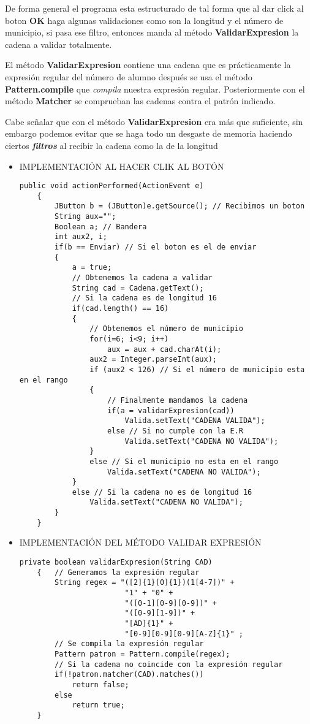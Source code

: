 \documentclass[12pt]{article}
\begin{document}
	De forma general el programa esta estructurado de tal forma que al dar click al boton \textbf{OK} haga algunas validaciones como son la longitud y el número de municipio, si pasa ese filtro, entonces manda al método \textbf{ValidarExpresion} la cadena a validar totalmente.

	El método \textbf{ValidarExpresion} contiene una cadena que es prácticamente la expresión regular del número de alumno después se usa el método \textbf{Pattern.compile}  que \textsl{compila} nuestra expresión regular. Posteriormente con el método \textbf{Matcher} se comprueban las cadenas contra el patrón indicado.

	Cabe señalar que con el método \textbf{ValidarExpresion} era más que suficiente, sin embargo podemos evitar que se haga todo un desgaste de memoria haciendo ciertos \textbf{\textsl{filtros}} al recibir la cadena como la de la longitud

	\newpage
	\begin{itemize}
		\item IMPLEMENTACIÓN AL HACER CLIK AL BOTÓN
		\begin{lstlisting}[style=Java]
	public void actionPerformed(ActionEvent e)
	{
		JButton b = (JButton)e.getSource(); // Recibimos un boton
		String aux="";
		Boolean a; // Bandera
		int aux2, i;
		if(b == Enviar) // Si el boton es el de enviar
		{	
			a = true;
			// Obtenemos la cadena a validar
			String cad = Cadena.getText(); 
			// Si la cadena es de longitud 16 
			if(cad.length() == 16)
			{	
				// Obtenemos el número de municipio
				for(i=6; i<9; i++) 
					aux = aux + cad.charAt(i);
				aux2 = Integer.parseInt(aux);
				if (aux2 < 126) // Si el número de municipio esta en el rango
				{
					// Finalmente mandamos la cadena 
					if(a = validarExpresion(cad)) 
						Valida.setText("CADENA VALIDA");
					else // Si no cumple con la E.R
						Valida.setText("CADENA NO VALIDA");	
				}
				else // Si el municipio no esta en el rango
					Valida.setText("CADENA NO VALIDA");
			} 
			else // Si la cadena no es de longitud 16
				Valida.setText("CADENA NO VALIDA");
		}
	}
		\end{lstlisting}			

		\item IMPLEMENTACIÓN DEL MÉTODO VALIDAR EXPRESIÓN
	
	\begin{lstlisting}[style=Java]
	private boolean validarExpresion(String CAD)
	{   // Generamos la expresión regular
		String regex = "([2]{1}[0]{1})(1[4-7])" + 
						"1" + "0" + 
						"([0-1][0-9][0-9])" + 
						"([0-9][1-9])" + 
						"[AD]{1}" + 
						"[0-9][0-9][0-9][A-Z]{1}" ;
		// Se compila la expresión regular
		Pattern patron = Pattern.compile(regex);
		// Si la cadena no coincide con la expresión regular
		if(!patron.matcher(CAD).matches()) 
			return false;
		else
			return true;
	}
	\end{lstlisting}

	\end{itemize}
		
\end{document}
